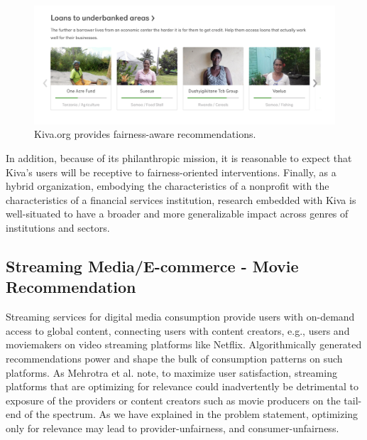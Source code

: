     
    \begin{figure}[htb]
    \includegraphics[width=0.98\columnwidth]{imgs/far/underbanked_areas.png}
    \caption{Kiva.org provides fairness-aware recommendations.}
    \label{fig:kiva_underbanked}
    \end{figure}
    
    In addition, because of its philanthropic mission, it is reasonable to expect that Kiva's users will be receptive to fairness-oriented interventions. Finally, as a hybrid organization, embodying the characteristics of a nonprofit with the characteristics of a financial services institution, research embedded with Kiva is well-situated to have a broader and more generalizable impact across genres of institutions and sectors.

    

    \subsection{Streaming Media/E-commerce - Movie Recommendation}

    Streaming services for digital media consumption provide users with on-demand access to global content, connecting users with content creators, e.g., users and moviemakers on video streaming platforms like Netflix. Algorithmically generated recommendations power and shape the bulk of consumption patterns on such platforms. As Mehrotra et al. \cite{Mehrotra2018Towards} note, to maximize user satisfaction, streaming platforms that are optimizing for relevance could inadvertently be detrimental to exposure of the providers or content creators such as movie producers on the tail-end of the spectrum. As we have explained in the problem statement, optimizing only for relevance may lead to provider-unfairness, and consumer-unfairness.
    
